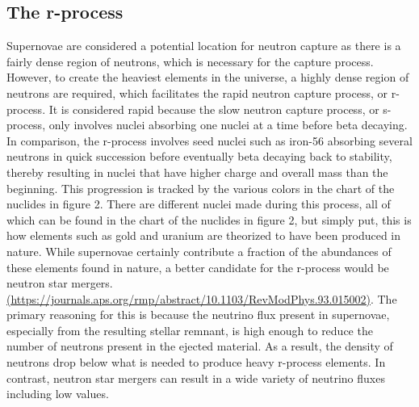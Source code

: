 \documentclass[11pt,a4paper]{article}
\begin{document}
\subsection{The r-process}

Supernovae are considered a potential location for neutron capture as there is a fairly dense region of neutrons, which is necessary for the capture process. However, to create the heaviest elements in the universe, a highly dense region of neutrons are required, which facilitates the rapid neutron capture process, or r-process. It is considered rapid because the slow neutron capture process, or s-process, only involves nuclei absorbing one nuclei at a time before beta decaying. In comparison, the r-process involves seed nuclei such as iron-56 absorbing several neutrons in quick succession before eventually beta decaying back to stability, thereby resulting in nuclei that have higher charge and overall mass than the beginning. This progression is tracked by the various colors in the chart of the nuclides in figure 2. There are different nuclei made during this process, all of which can be found in the chart of the nuclides in figure 2, but simply put, this is how elements such as gold and uranium are theorized to have been produced in nature. While supernovae certainly contribute a fraction of the abundances of these elements found in nature, a better candidate for the r-process would be neutron star mergers. \url{(https://journals.aps.org/rmp/abstract/10.1103/RevModPhys.93.015002)}. The primary reasoning for this is because the neutrino flux present in supernovae, especially from the resulting stellar remnant, is high enough to reduce the number of neutrons present in the ejected material. As a result, the density of neutrons drop below what is needed to produce heavy r-process elements. In contrast, neutron star mergers can result in a wide variety of neutrino fluxes including low values.
\end{document}
